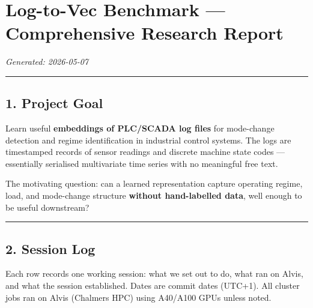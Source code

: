 \documentclass[11pt,a4paper]{article}
\begin{document}
\section{Log-to-Vec Benchmark --- Comprehensive Research Report}

\textit{Generated: 2026-05-07}

\vspace{4pt}\hrule\vspace{4pt}

\subsection{1. Project Goal}

Learn useful \textbf{embeddings of PLC/SCADA log files} for mode-change detection and regime
identification in industrial control systems. The logs are timestamped records of sensor readings
and discrete machine state codes --- essentially serialised multivariate time series with no
meaningful free text.

The motivating question: can a learned representation capture operating regime, load, and
mode-change structure \textbf{without hand-labelled data}, well enough to be useful downstream?

\vspace{4pt}\hrule\vspace{4pt}

\subsection{2. Session Log}

Each row records one working session: what we set out to do, what ran on Alvis, and what the
session established. Dates are commit dates (UTC+1). All cluster jobs ran on Alvis (Chalmers
HPC) using A40/A100 GPUs unless noted.
\end{document}
